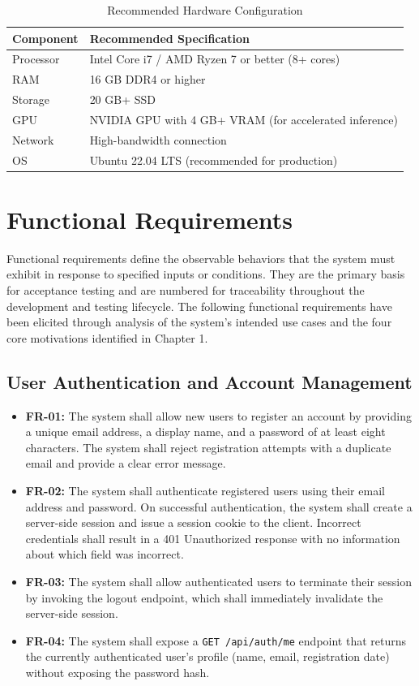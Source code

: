 \documentclass[12pt, a4paper]{report}
\begin{document}
\begin{table}[H]
\centering
\caption{Recommended Hardware Configuration}
\label{tab:hw-rec}
\small
\begin{tabularx}{\textwidth}{|l|X|}
\hline
\textbf{Component} & \textbf{Recommended Specification} \\
\hline
Processor & Intel Core i7 / AMD Ryzen 7 or better (8+ cores) \\
\hline
RAM & 16 GB DDR4 or higher \\
\hline
Storage & 20 GB+ SSD \\
\hline
GPU & NVIDIA GPU with 4 GB+ VRAM (for accelerated inference) \\
\hline
Network & High-bandwidth connection \\
\hline
OS & Ubuntu 22.04 LTS (recommended for production) \\
\hline
\end{tabularx}
\end{table}

\section{Functional Requirements}

Functional requirements define the observable behaviors that the system must exhibit in response to specified inputs or conditions. They are the primary basis for acceptance testing and are numbered for traceability throughout the development and testing lifecycle. The following functional requirements have been elicited through analysis of the system's intended use cases and the four core motivations identified in Chapter 1.

\subsection{User Authentication and Account Management}

\begin{itemize}[noitemsep, leftmargin=2em]
    \item \textbf{FR-01:} The system shall allow new users to register an account by providing a unique email address, a display name, and a password of at least eight characters. The system shall reject registration attempts with a duplicate email and provide a clear error message.
    \item \textbf{FR-02:} The system shall authenticate registered users using their email address and password. On successful authentication, the system shall create a server-side session and issue a session cookie to the client. Incorrect credentials shall result in a 401 Unauthorized response with no information about which field was incorrect.
    \item \textbf{FR-03:} The system shall allow authenticated users to terminate their session by invoking the logout endpoint, which shall immediately invalidate the server-side session.
    \item \textbf{FR-04:} The system shall expose a \texttt{GET /api/auth/me} endpoint that returns the currently authenticated user's profile (name, email, registration date) without exposing the password hash.
\end{itemize}
\end{document}
